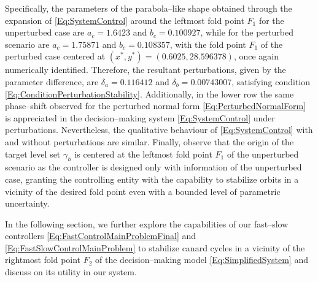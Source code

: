 \documentclass[3p]{elsarticle}
\theoremstyle{plain}
\theoremstyle{remark}
\theoremstyle{definition}
\begin{document}
Specifically, the parameters of the parabola--like shape obtained through the expansion of \eqref{Eq:SystemControl} around the leftmost fold point $F_{1}$ for the unperturbed case are $a_{c}=1.6423$ and $b_{c}=0.100927$, while for the perturbed scenario are $a_{c}=1.75871$ and $b_{c}=0.108357$, with the fold point $F_{1}$ of the perturbed case centered at $(x^{*}, y^{*}) = (0.6025, 28.596378)$, once again numerically identified. Therefore, the resultant perturbations, given by the parameter difference, are $\delta_{a}=0.116412$ and $\delta_{b}=0.00743007$, satisfying condition \eqref{Eq:ConditionPerturbationStability}. Additionally, in the lower row the same phase--shift observed for the perturbed normal form \eqref{Eq:PerturbedNormalForm} is appreciated in the decision--making system \eqref{Eq:SystemControl} under perturbations. Nevertheless, the qualitative behaviour of \eqref{Eq:SystemControl} with and without perturbations are similar. Finally, observe that the origin of the target level set $\gamma_{h}$ is centered at the leftmost fold point $F_{1}$ of the unperturbed scenario as the controller is designed only with information of the unperturbed case, granting the controlling entity with the capability to stabilize orbits in a vicinity of the desired fold point even with a bounded level of parametric uncertainty.

In the following section, we further explore the capabilities of our fast--slow controllers \eqref{Eq:FastControlMainProblemFinal} and \eqref{Eq:FastSlowControlMainProblem} to stabilize canard cycles in a vicinity of the rightmost fold point $F_2$ of the decision--making model \eqref{Eq:SimplifiedSystem} and discuss on its utility in our system.
\end{document}
